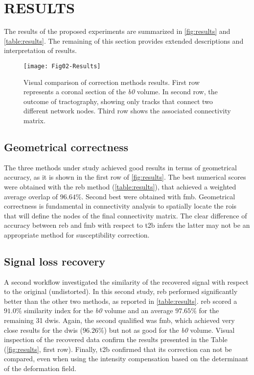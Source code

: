 \section{RESULTS}
\label{sec:results}
The results of the proposed experiments are summarized
in \autoref{fig:results} and \autoref{table:results}.
The remaining of this section provides extended descriptions
and interpretation of results.



\begin{figure*}[tpb]
   \centering
   \texttt{[image: Fig02-Results]}
   \caption{Visual comparison of correction methods results. 
   First row represents
   a coronal section of the \textit{b0} volume. In second row, the outcome
   of tractography, showing only tracks that connect two different
   network nodes. Third row shows the associated connectivity matrix. }
   \label{fig:results}
\end{figure*}


\subsection{Geometrical correctness}

The three methods under study achieved good results in
terms of geometrical accuracy, as it is shown in the first
row of \autoref{fig:results}. The best numerical scores
were obtained with the \gls*{reb} method (\autoref{table:results}),
that achieved a weighted average overlap of $96.64\%$. Second
best were obtained with \gls*{fmb}. Geometrical correctness
is fundamental in connectivity analysis to spatially locate the
\glspl*{roi} that will define the nodes of the final connectivity
matrix. The clear difference of accuracy between \gls*{reb} and \gls*{fmb}
with respect to \gls*{t2b} infers the latter may not be
an appropriate method for susceptibility correction.

\subsection{Signal loss recovery}

A second workflow investigated the similarity of the recovered
signal with respect to the original (undistorted).
In this second study, \gls*{reb} performed significantly
better than the other two methods, as reported
in \autoref{table:results}. \gls*{reb} scored a $91.0\%$
similarity index for the \textit{b0} volume and an average $97.65\%$
for the remaining 31 \glspl*{dwi}. Again, the second
qualified was \gls*{fmb}, which achieved very close results
for the \glspl*{dwi} ($96.26\%$) but not as good for the \textit{b0}
volume. Visual inspection of the recovered data confirm the 
results presented in the Table (\autoref{fig:results}, first
row). Finally, \gls*{t2b} confirmed that its correction
can not be compared, even when using the intensity compensation
based on the determinant of the deformation field.

